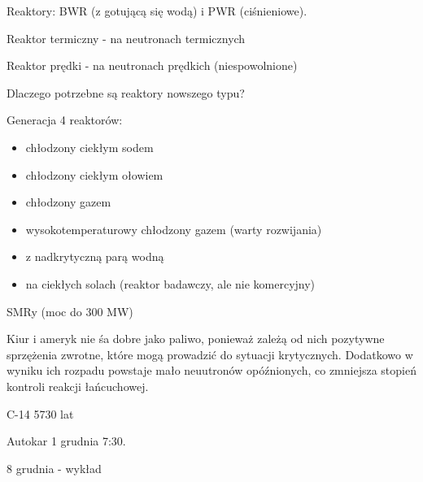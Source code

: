 \documentclass{article}
\begin{document}
Reaktory: BWR (z gotującą się wodą) i PWR (ciśnieniowe).

Reaktor termiczny - na neutronach termicznych

Reaktor prędki - na neutronach prędkich (niespowolnione)

Dlaczego potrzebne są reaktory nowszego typu?

Generacja 4 reaktorów:
\begin{itemize}
    \item chłodzony ciekłym sodem
    \item chłodzony ciekłym ołowiem
    \item chłodzony gazem
    \item wysokotemperaturowy chłodzony gazem (warty rozwijania)
    \item z nadkrytyczną parą wodną
    \item na ciekłych solach (reaktor badawczy, ale nie komercyjny)
\end{itemize}

SMRy (moc do 300 MW)

Kiur i ameryk nie śa dobre jako paliwo, ponieważ zależą od nich pozytywne sprzężenia zwrotne, które mogą prowadzić do sytuacji krytycznych. Dodatkowo w wyniku ich rozpadu powstaje mało neuutronów opóźnionych, co zmniejsza stopień kontroli reakcji łańcuchowej.

C-14 5730 lat

Autokar 1 grudnia 7:30.

8 grudnia - wykład
\end{document}
